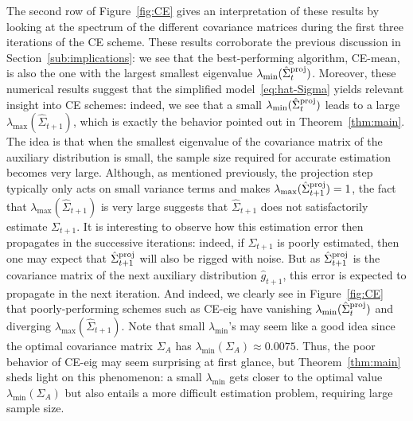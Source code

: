 \documentclass[]{article}
\newcommand{\proj}{{\textnormal{\textrm{proj}}}} %
\theoremstyle{plain}
\theoremstyle{definition}
\begin{document}
The second row of Figure~\ref{fig:CE} gives an interpretation of these results by looking at the spectrum of the different covariance matrices during the first three iterations of the CE scheme. These results corroborate the previous discussion in Section~\ref{sub:implications}: we see that the best-performing algorithm, CE-mean, is also the one with the largest smallest eigenvalue $\lambda_{\min}(\hat \Sigma^\proj_t)$. Moreover, these numerical results suggest that the simplified model~\eqref{eq:hat-Sigma} yields relevant insight into CE schemes: indeed, we see that a small $\lambda_{\min}(\hat \Sigma^\proj_t)$ leads to a large $\lambda_{\max}(\hat \Sigma_{t+1})$, which is exactly the behavior pointed out in Theorem~\ref{thm:main}. The idea is that when the smallest eigenvalue of the covariance matrix of the auxiliary distribution is small, the sample size required for accurate estimation becomes very large. Although, as mentioned previously, the projection step typically only acts on small variance terms and makes $\lambda_{\max}(\hat \Sigma^\proj_{t+1}) = 1$, the fact that $\lambda_{\max}(\hat \Sigma_{t+1})$ is very large suggests that $\hat \Sigma_{t+1}$ does not satisfactorily estimate $\Sigma_{t+1}$. It is interesting to observe how this estimation error then propagates in the successive iterations: indeed, if $\Sigma_{t+1}$ is poorly estimated, then one may expect that $\hat \Sigma^\proj_{t+1}$ will also be rigged with noise. But as $\hat \Sigma^\proj_{t+1}$ is the covariance matrix of the next auxiliary distribution $\hat g_{t+1}$, this error is expected to propagate in the next iteration. And indeed, we clearly see in Figure~\ref{fig:CE} that poorly-performing schemes such as CE-eig have vanishing $\lambda_{\min}(\hat \Sigma^\proj_t)$ and diverging $\lambda_{\max}(\hat \Sigma_{t+1})$. Note that small $\lambda_{\min}$'s may seem like a good idea since the optimal covariance matrix $\Sigma_A$ has $\lambda_{\min}(\Sigma_A) \approx 0.0075$. Thus, the poor behavior of CE-eig may seem surprising at first glance, but Theorem~\ref{thm:main} sheds light on this phenomenon: a small $\lambda_{\min}$ gets closer to the optimal value $\lambda_{\min}(\Sigma_A)$ but also entails a more difficult estimation problem, requiring large sample size.
\\
\end{document}
